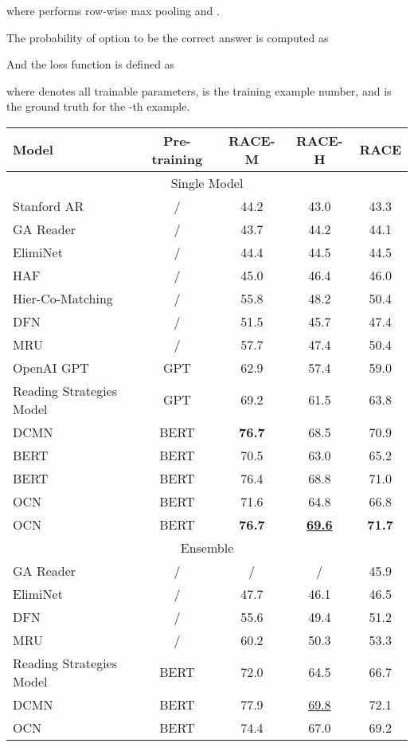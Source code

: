\documentclass[11pt,a4paper]{article}
\newcommand\BERTBASE{BERT\xspace}
\newcommand\BERTLARGE{BERT\xspace}
\newcommand\OCNBASE{OCN\xspace}
\newcommand\OCNLARGE{OCN\xspace}
\begin{document}
where  performs row-wise max pooling and .

The probability  of option  to be the correct answer is computed as

And the loss function is defined as

where  denotes all trainable parameters,  is the training example number, and  is the ground truth for the -th example.


\begin{table*}
    \vspace{-1em}
	\centering
	\small
	\begin{tabular}{lcccc}
		\toprule
		Model & Pre-training & RACE-M & RACE-H & RACE \\
		\midrule \multicolumn{5}{c}{Single Model} \\
\midrule
		Stanford AR~\cite{StanfordAR} & / & 44.2 & 43.0 & 43.3 \\
		GA Reader~\cite{GAReader} & / & 43.7 & 44.2 & 44.1 \\
		ElimiNet~\cite{ElimiNet} & / & 44.4 & 44.5 & 44.5 \\ HAF~\cite{HAF} & / & 45.0 & 46.4 & 46.0 \\ Hier-Co-Matching~\cite{co-matching} & / & 55.8 & 48.2 & 50.4 \\ DFN~\cite{DFN} & / & 51.5 & 45.7 & 47.4 \\  MRU~\cite{MRU} & / & 57.7 & 47.4 & 50.4 \\ OpenAI GPT~\cite{OpenAIGPT} & GPT & 62.9 & 57.4 & 59.0 \\ Reading Strategies Model~\cite{Reading-Strategies-Model} & GPT & 69.2 & 61.5 & 63.8 \\ DCMN~\cite{shuailiang2019DCMN} & BERT & {\bf 76.7} & 68.5 & 70.9 \\\BERTBASE & BERT & 70.5 & 63.0 & 65.2 \\
		\BERTLARGE & BERT & 76.4 & 68.8 & 71.0 \\
		\OCNBASE & BERT & 71.6 & 64.8 & 66.8 \\
		\OCNLARGE & BERT & {\bf 76.7} & {\bf \underline{69.6}} & {\bf 71.7} \\
		\midrule \multicolumn{5}{c}{Ensemble} \\
\midrule
		GA Reader~\cite{GAReader} & / & / & / & 45.9 \\
		ElimiNet~\cite{ElimiNet} & / & 47.7 & 46.1 & 46.5 \\ DFN~\cite{DFN} & / & 55.6 & 49.4 & 51.2 \\ MRU~\cite{MRU} & / & 60.2 & 50.3 & 53.3 \\ Reading Strategies Model~\cite{Reading-Strategies-Model} & BERT & 72.0 & 64.5 & 66.7 \\ DCMN~\cite{shuailiang2019DCMN} & BERT & 77.9 & \underline{69.8} & 72.1 \\\OCNBASE & BERT & 74.4 & 67.0 & 69.2 \\

\end{tabular}
\end{table*}
\end{document}
